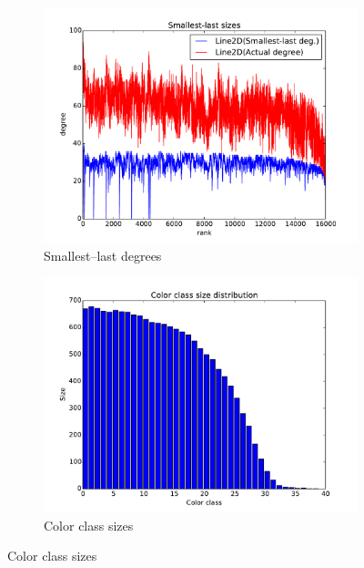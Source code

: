 \documentclass[oneside, titlepage]{scrartcl}
\begin{document}
\begin{figure}[!h]
\begin{subfigure}{0.5\textwidth}
	\centering
	\includegraphics[width=0.9\linewidth]{figures/ordering4.pdf}
	\caption{Smallest--last degrees}
\end{subfigure}%
\begin{subfigure}{0.5\textwidth}
	\centering
	\includegraphics[width=0.9\linewidth]{figures/colors4.pdf}
	\caption{Color class sizes}
\end{subfigure}


\end{figure}
\end{document}
